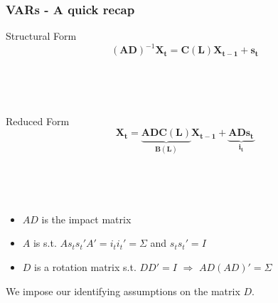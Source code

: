 \documentclass{beamer}
\begin{document}
\begin{frame}
	\frametitle{VARs - A quick recap}
	\label{identification}
	
Structural Form	
\begin{equation}
(\mathbf{AD})^{-1}
    \mathbf{X_{t}}
= \mathbf{C(L)} 
\mathbf{X_{t-1}}
+ \mathbf{s_t}
\end{equation}

\

\

Reduced Form
\begin{equation}
\mathbf{X_{t}}
= \underbrace{\mathbf{AD} \mathbf{C(L)}}_\text{$\mathbf{B(L)}$} 
\mathbf{X_{t-1}}
+ \underbrace{\mathbf{AD} \mathbf{s_t}}_\text{$\mathbf{i_t}$}
\end{equation}

\

\

\begin{itemize}
	\item $AD$ is the impact matrix
	\item $A$ is s.t. $As_t s_t' A' = i_t i_t' = \Sigma$ and $s_t s_t' = I$
	\item $D$ is a rotation matrix s.t. $DD' = I$ $\Rightarrow$ $AD(AD)' = \Sigma$
\end{itemize}

We impose our identifying assumptions on the matrix $D$. \hyperlink{Technicalities}{}

\end{frame}
\end{document}
